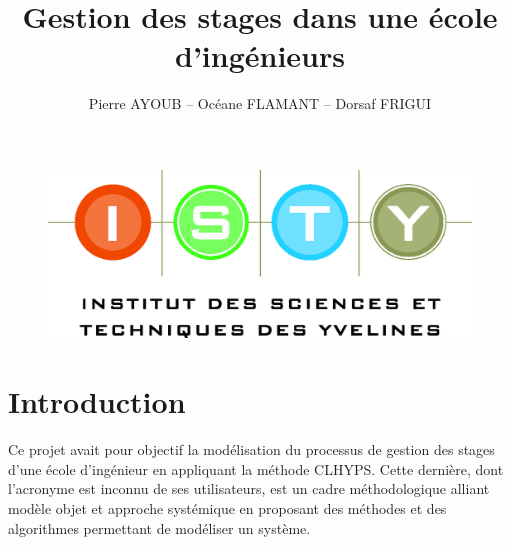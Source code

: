 \documentclass[12pt,a4paper]{article}
\begin{document}
\title{Gestion des stages dans une école d'ingénieurs}
\author{Pierre AYOUB -- Océane FLAMANT -- Dorsaf FRIGUI}

\maketitle

\begin{figure}[b]
    \centering
    \includegraphics[scale=0.3]{figures/isty.jpg}
\end{figure}

\tableofcontents

\section{Introduction}

Ce projet avait pour objectif la modélisation du processus de gestion des stages
d'une école d'ingénieur en appliquant la méthode CLHYPS. Cette dernière, dont
l'acronyme est inconnu de ses utilisateurs, est un cadre méthodologique alliant
modèle objet et approche systémique en proposant des méthodes et des algorithmes
permettant de modéliser un système.
\end{document}
